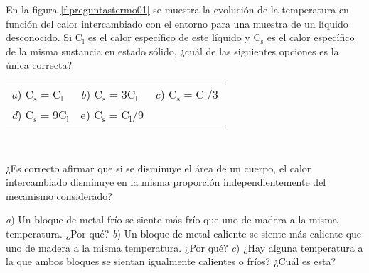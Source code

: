 \begin{Exercise}\label{p:preguntastermo01}
  {}{}
  En la figura \ref{f:preguntastermo01} se muestra la evolución de la temperatura en función del calor intercambiado con el entorno para una muestra de un líquido desconocido. Si $\text{C}_{\text{l}}$ es el calor específico de este líquido y $\text{C}_{\text{s}}$ es el calor específico de la misma sustancia en estado sólido, ¿cuál de las siguientes opciones es la única correcta?\\
\renewcommand{\arraystretch}{1.5}
  \begin{tabular}{p{2.5cm} p{2.5cm} p{2.5cm}}
     \textit{a}) $\text{C}_{\text{s}}=\text{C}_{\text{l}}$ & \textit{b}) $\text{C}_{\text{s}}=3\text{C}_{\text{l}}$ & \textit{c}) $\text{C}_{\text{s}}=\text{C}_{\text{l}}/3$ \\
     \textit{d}) $\text{C}_{\text{s}}=9\text{C}_{\text{l}}$ & e) $\text{C}_{\text{s}}=\text{C}_{\text{l}}/9$ \\
  \end{tabular} \\
\end{Exercise}
%
\begin{center}
\end{center}
%
\begin{Exercise}
  ¿Es correcto afirmar que si se disminuye el área de un cuerpo, el calor intercambiado disminuye en la misma proporción independientemente del mecanismo considerado?
\end{Exercise}
%
\begin{Exercise}
  \textit{a}) Un bloque de metal frío se siente más frío que uno de madera a la misma temperatura. ¿Por qué? \textit{b}) Un bloque de metal caliente se siente más caliente que uno de madera a la misma temperatura. ¿Por qué? \textit{c}) ¿Hay alguna temperatura a la que ambos bloques se sientan igualmente calientes o fríos? ¿Cuál es esta?
\end{Exercise}
